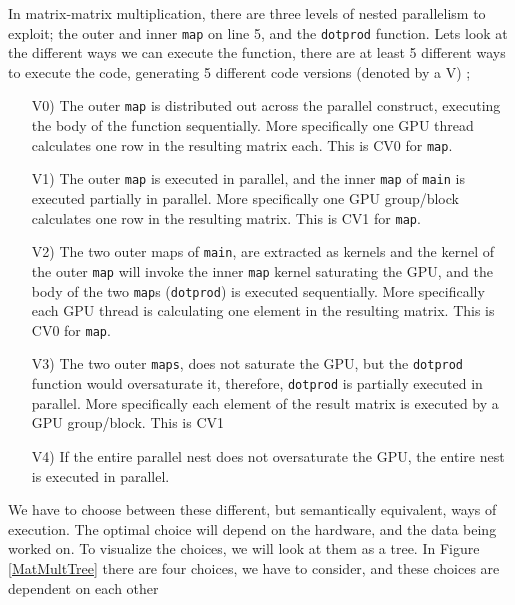 \begin{center}
	\centering 
	
	\label{maptree}
\end{center}
In matrix-matrix multiplication, there are three levels of nested parallelism to exploit; the outer and inner \texttt{map} on line 5, and the \texttt{dotprod} function. Lets look at the different ways we can execute the function, there are at least 5 different ways to execute the code, generating 5 different code versions (denoted by a V) \cite{inc-flat};
\begin{itemize}
	\item[V0)] The outer \texttt{map} is distributed out across the parallel construct, executing the body of the function sequentially. More specifically one GPU thread calculates one row in the resulting matrix each. This is CV0 for \texttt{map}.
	\item[V1)] The outer \texttt{map} is executed in parallel, and the inner \texttt{map} of \texttt{main} is executed partially in parallel. More specifically one GPU group/block calculates one row in the resulting matrix. This is CV1 for \texttt{map}. 
	\item[V2)] The two outer maps of \texttt{main}, are extracted as kernels and the kernel of the outer \texttt{map} will invoke the inner \texttt{map} kernel saturating the GPU, and the body of the two \texttt{map}s (\texttt{dotprod}) is executed sequentially. More specifically each GPU thread is calculating one element in the resulting matrix. This is CV0 for \texttt{map}.
	\item[V3)] The two outer \texttt{maps}, does not saturate the GPU, but the \texttt{dotprod} function would oversaturate it, therefore, \texttt{dotprod} is partially executed in parallel. More specifically each element of the result matrix is executed by a GPU group/block. This is CV1
	\item[V4)] If the entire parallel nest does not oversaturate the GPU, the entire nest is executed in parallel.
\end{itemize} 
We have to choose between these different, but semantically equivalent, ways of execution. The optimal choice will depend on the hardware, and the data being worked on. To visualize the choices, we will look at them as a tree. In Figure \ref{MatMultTree} there are four choices, we have to consider, and these choices are dependent on each other
\begin{center}
	\centering 
	
	\label{MatMultTree}
\end{center}
